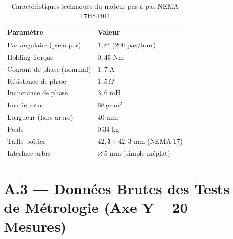 \begin{table}[htbp]
\centering
\renewcommand{\arraystretch}{1.3}
\begin{tabular}{|l|l|}
\hline
\rowcolor{macouleur!20}
\textbf{Paramètre} & \textbf{Valeur} \\
\hline
Pas angulaire (plein pas) & $1{,}8°$ (200 pas/tour) \\
\hline
Holding Torque & $0{,}45$ Nm \\
\hline
Courant de phase (nominal) & $1{,}7$ A \\
\hline
Résistance de phase & $1{,}5\,\Omega$ \\
\hline
Inductance de phase & $3{,}6$ mH \\
\hline
Inertie rotor & $68\,g.cm^2$ \\
\hline
Longueur (hors arbre) & 40 mm \\
\hline
Poids & 0{,}34 kg \\
\hline
Taille boîtier & $42{,}3 \times 42{,}3$ mm (NEMA 17) \\
\hline
Interface arbre & $\varnothing\, 5$ mm (simple méplat) \\
\hline
\end{tabular}
\caption{Caractéristiques techniques du moteur pas-à-pas NEMA 17HS4401}
\label{tab:nema17_specs}
\end{table}

\section{A.3 — Données Brutes des Tests de Métrologie (Axe Y -- 20 Mesures)}

